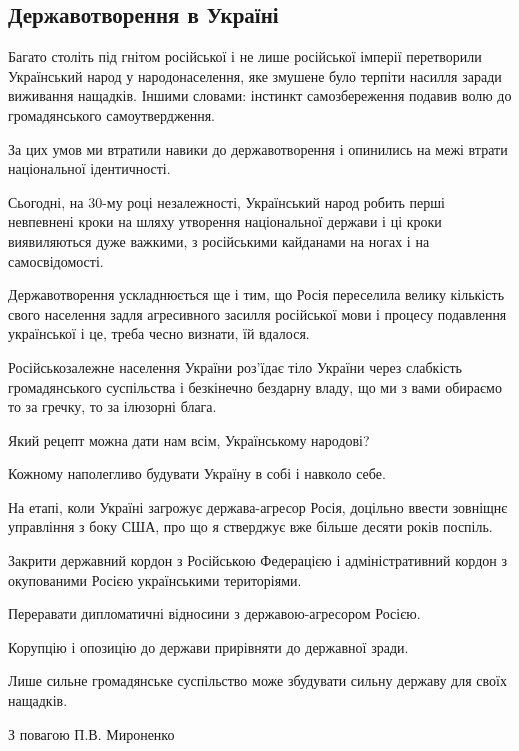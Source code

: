  
 
 
 
 

\subsection{Державотворення в Україні}
\label{sec:11_04_2021.fb.myronenko_petr.1.vneshneje_upravlenie_usa_rossia}

Багато століть під гнітом російської і не лише російської імперії перетворили
Український народ у народонаселення, яке змушене було терпіти насилля заради
виживання нащадків. Іншими словами: інстинкт самозбереження подавив волю до
громадянського самоутвердження.

За цих умов ми втратили навики до державотворення і опинились на межі втрати
національної ідентичності.

Сьогодні, на 30-му році незалежності, Український народ робить перші невпевнені
кроки на шляху утворення національної держави і ці кроки виявиляються дуже
важкими, з російськими кайданами на ногах і на самосвідомості.

Державотворення ускладнюється ще і тим, що Росія переселила велику кількість
свого населення задля агресивного засилля російської мови і процесу подавлення
української і це, треба чесно визнати, їй вдалося.

Російськозалежне населення України роз'їдає тіло України через слабкість
громадянського суспільства і безкінечно бездарну владу, що ми з вами обираємо
то за гречку, то за ілюзорні блага.

Який рецепт можна дати нам всім, Українському народові? 

Кожному наполегливо будувати Україну в собі і навколо себе.

На етапі, коли Україні загрожує держава-агресор Росія, доцільно ввести зовніщнє
управління з боку США, про що я стверджує вже більше десяти років поспіль.

Закрити державний кордон з Російською Федерацією і адміністративний кордон з
окупованими Росією українськими територіями.

Переравати дипломатичні відносини з державою-агресором Росією.

Корупцію і опозицію до держави прирівняти до державної зради.

Лише сильне громадянське суспільство може збудувати сильну державу для своїх нащадків.

З повагою П.В. Мироненко
